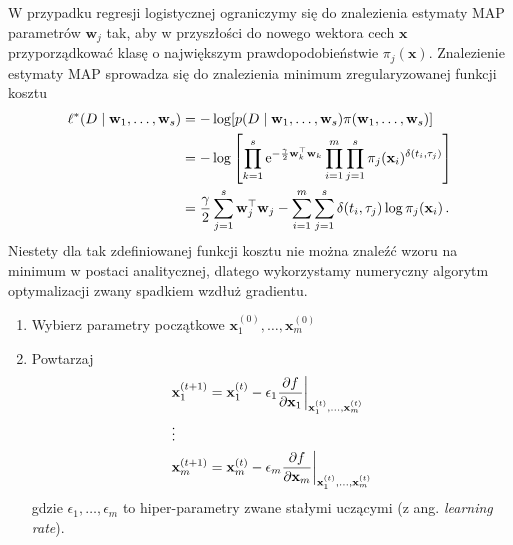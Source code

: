 \documentclass{myclass}
\begin{document}
W przypadku regresji logistycznej ograniczymy się do znalezienia estymaty MAP parametrów
\(\mathbf{w}_j\) tak, aby w przyszłości do nowego wektora cech \(\mathbf{x}\) przyporządkować klasę
o największym prawdopodobieństwie \(\pi_j(\mathbf{x})\). Znalezienie estymaty MAP sprowadza się do
znalezienia minimum zregularyzowanej funkcji kosztu
\begin{equation*}
    \begin{split}
        \ell^*(D \mid \mathbf{w}_1,\ldots,\mathbf{w}_s) &= -\log [p(D \mid \mathbf{w}_1,\ldots,\mathbf{w}_s ) \pi(\mathbf{w}_1, \ldots, \mathbf{w}_s)] \\
        &= - \log \left[\prod_{k=1}^s\mathrm{e}^{-\frac{\gamma}{2}\mathbf{w}_k^\top\mathbf{w}_k}\prod_{i=1}^m \prod_{j=1}^s \pi_j(\mathbf{x}_i)^{\delta(t_i,\tau_j)}\right]\\
        &= \frac{\gamma}{2}\sum_{j=1}^s \mathbf{w}_j^\top\mathbf{w}_j - \sum_{i=1}^m\sum_{j=1}^s \delta(t_i,\tau_j)\log\pi_j(\mathbf{x}_i)\,.
    \end{split}
\end{equation*}
Niestety dla tak zdefiniowanej funkcji kosztu nie można znaleźć wzoru na minimum w postaci
analitycznej, dlatego wykorzystamy numeryczny algorytm optymalizacji zwany spadkiem wzdłuż
gradientu.

\begin{tcolorbox}[title=Algorytm spadku wzdłuż gradientu]
\begin{enumerate}
    \item Wybierz parametry początkowe \(\mathbf{x}_1^{(0)}, \ldots, \mathbf{x}_m^{(0)}\)
    \item Powtarzaj
    \begin{equation*}
        \begin{split}
            &\mathbf{x}_1^{(t+1)} = \mathbf{x}_1^{(t)} - \epsilon_1\pdv{f}{\mathbf{x}_1}\bigg|_{\mathbf{x}_1^{(t)}, \ldots, \mathbf{x}_m^{(t)}}\\
            &\vdots\\
            &\mathbf{x}_m^{(t+1)} = \mathbf{x}_m^{(t)} - \epsilon_m\pdv{f}{\mathbf{x}_m}\bigg|_{\mathbf{x}_1^{(t)}, \ldots, \mathbf{x}_m^{(t)}}
        \end{split}
    \end{equation*}
    gdzie \(\epsilon_1,\ldots,\epsilon_m\) to hiper-parametry zwane stałymi uczącymi (z ang.
    \textit{learning rate}).
\end{enumerate}
\end{tcolorbox}
\end{document}
